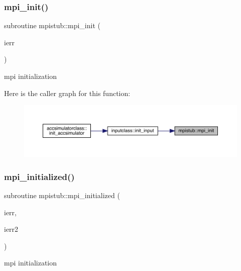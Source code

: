 \subsubsection{\texorpdfstring{mpi\_init()}{mpi\_init()}}
{\footnotesize\ttfamily subroutine mpistub\+::mpi\+\_\+init (\begin{DoxyParamCaption}\item[{}]{ierr }\end{DoxyParamCaption})}



mpi initialization 

Here is the caller graph for this function\+:\nopagebreak
\begin{figure}[H]
\begin{center}
\leavevmode
\includegraphics[width=350pt]{namespacempistub_af6819ee02570b8c8bef94e79e67a4af9_icgraph}
\end{center}
\end{figure}
\mbox{\label{namespacempistub_aa720efd8024be5bb417f89dfd1b02c9d}} 
\subsubsection{\texorpdfstring{mpi\_initialized()}{mpi\_initialized()}}
{\footnotesize\ttfamily subroutine mpistub\+::mpi\+\_\+initialized (\begin{DoxyParamCaption}\item[{}]{ierr,  }\item[{}]{ierr2 }\end{DoxyParamCaption})}



mpi initialization 

\mbox{\label{namespacempistub_ada728226719e1870c85e45f6594cccbd}} 
